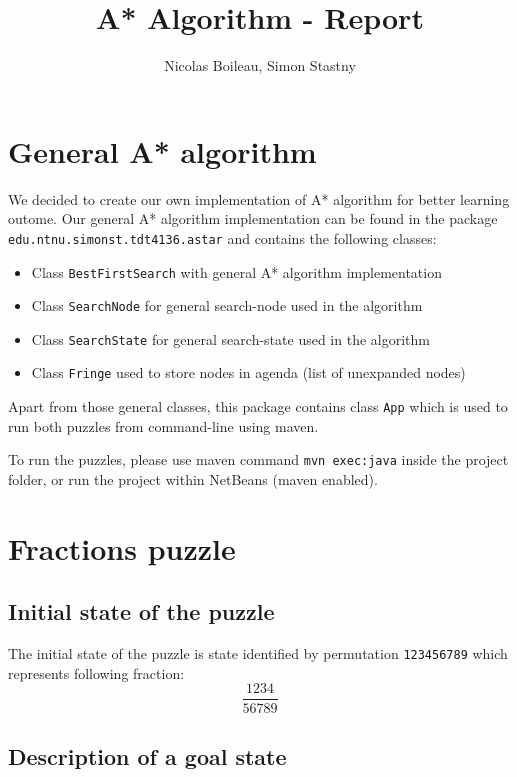 \documentclass{article}
\begin{document}
\providecommand{\abs}[1]{\lvert#1\rvert}

\title{A* Algorithm - Report}
\author{Nicolas Boileau, Simon Stastny}

\maketitle

\section{General A* algorithm}

We decided to create our own implementation of A* algorithm for better learning
outome. Our general A* algorithm implementation can be found in the package
\texttt{edu.ntnu.simonst.tdt4136.astar} and contains the following classes:

\begin{itemize}
  \item Class \texttt{BestFirstSearch} with general A* algorithm implementation
  \item Class \texttt{SearchNode} for general search-node used in the algorithm
  \item Class \texttt{SearchState} for general search-state used in the
  algorithm
  \item Class \texttt{Fringe} used to store nodes in agenda (list of unexpanded
  nodes)
\end{itemize} 

Apart from those general classes, this package contains class \texttt{App} which
is used to run both puzzles from command-line using maven.

To run the puzzles, please use maven command \texttt{mvn exec:java} inside the
project folder, or run the project within NetBeans (maven enabled).

\section{Fractions puzzle}

\subsection{Initial state of the puzzle}

The initial state of the puzzle is state identified by permutation
\texttt{123456789} which represents following fraction:
\[
 \frac{1234}{56789}
\]

\subsection{Description of a goal state} \label{fracgoal}
\end{document}
